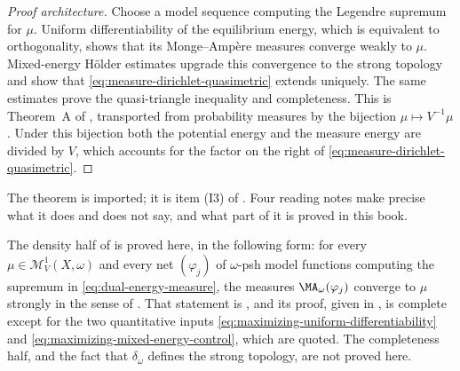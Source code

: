 \begin{proof}[Proof architecture]
Choose a model sequence computing the Legendre supremum for \(\mu\).
Uniform differentiability of the equilibrium energy, which is equivalent to
orthogonality, shows that its Monge--Amp\`ere measures converge weakly to
\(\mu\).  Mixed-energy Hölder estimates upgrade this convergence to the
strong topology and show that \eqref{eq:measure-dirichlet-quasimetric}
extends uniquely.  The same estimates prove the quasi-triangle inequality
and completeness.  This is Theorem~A of \cite{BJ25FiniteEnergy}, transported
from probability measures by the bijection
$\mu\mapsto V^{-1}\mu$.  Under this bijection both the potential energy and
the measure energy are divided by $V$, which accounts for the factor on the
right of \eqref{eq:measure-dirichlet-quasimetric}.
\end{proof}

The theorem is imported; it is item \textup{(I3)} of
.  Four reading notes make precise what it does and
does not say, and what part of it is proved in this book.

\begin{remark}
\label{rem:ch28-what-of-completion-is-proved}
The density half of  is proved
here, in the following form: for every \(\mu\in\mathcal M^1_V(X,\omega)\)
and every net \((\varphi_j)\) of \(\omega\)-psh model functions computing
the supremum in \eqref{eq:dual-energy-measure}, the measures
\(\MA_\omega(\varphi_j)\) converge to \(\mu\) strongly in the sense of
.  That statement is
, and its proof, given in
, is complete except for the two quantitative
inputs \eqref{eq:maximizing-uniform-differentiability} and
\eqref{eq:maximizing-mixed-energy-control}, which are quoted.  The
completeness half, and the fact that \(\delta_\omega\) defines the strong
topology, are not proved here.
\end{remark}

